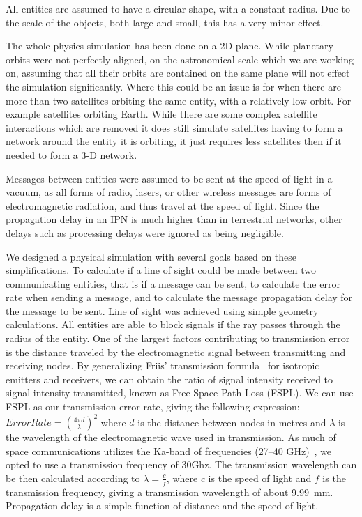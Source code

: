 \documentclass[a4paper,12pt]{article}
\begin{document}
All entities are assumed to have a circular shape, with a constant radius. Due
to the scale of the objects, both large and small, this has a very minor effect.

The whole physics simulation has been done on a 2D plane. While planetary orbits
were not perfectly aligned, on the astronomical scale which we are working on,
assuming that all their orbits are contained on the same plane will not effect
the simulation significantly. Where this could be an issue is for when there are
more than two satellites orbiting the same entity, with a relatively low orbit.
For example satellites orbiting Earth. While there are some complex satellite
interactions which are removed it does still simulate satellites having to form
a network around the entity it is orbiting, it just requires less satellites
then if it needed to form a 3-D network.

Messages between entities were assumed to be sent at the speed of light in a
vacuum, as all forms of radio, lasers, or other wireless messages are forms of
electromagnetic radiation, and thus travel at the speed of light. Since the
propagation delay in an IPN is much higher than in terrestrial networks, other
delays such as processing delays were ignored as being negligible.

We designed a physical simulation with several goals based on these
simplifications. To calculate if a line of sight could be made between two
communicating entities, that is if a message can be sent, to calculate the error
rate when sending a message, and to calculate the message propagation delay for
the message to be sent. Line of sight was achieved using simple geometry
calculations. All entities are able to block signals if the ray passes through
the radius of the entity. One of the largest factors contributing to
transmission error is the distance traveled by the electromagnetic signal
between transmitting and receiving nodes. By generalizing Friis' transmission
formula~\cite{Friis} for isotropic emitters and receivers, we can obtain the
ratio of signal intensity received to signal intensity transmitted, known as
Free Space Path Loss (FSPL). We can use FSPL as our transmission error rate,
giving the following expression: $Error Rate = {(\frac{4 \pi d}{\lambda})}^2$
where $d$ is the distance between nodes in metres and $\lambda$ is the
wavelength of the electromagnetic wave used in transmission. As much of space
communications utilizes the Ka-band of frequencies (27--40
GHz)~\cite{Morabito_Hastrup}, we opted to use a transmission frequency of 30Ghz.
The transmission wavelength can be then calculated according to
$\lambda = \frac{c}{f}$, where $c$ is the speed of light and $f$ is the
transmission frequency, giving a transmission wavelength of about 9.99~mm.
Propagation delay is a simple function of distance and the speed of light.
\end{document}
